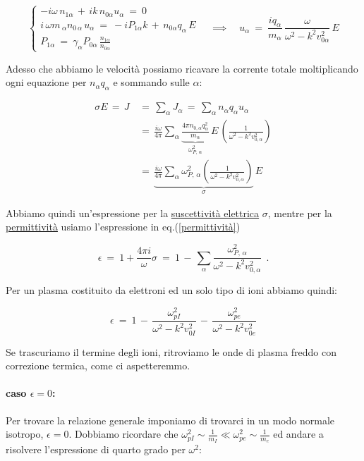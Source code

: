 \[\begin{cases}
	-i\omega\,n_{1\alpha}\,+\,ik\,n_{0\alpha}u_\alpha\ =\ 0
	\\
	i\,\omega m\,_\alpha n_{0\,\alpha}\,u_\alpha\ =\ -iP_{1\alpha}k\,+\, n_{0\alpha}q_{\alpha}\, E
	\\
	P_{1\alpha}\ =\ \gamma_\alpha P_{0\alpha}\, \frac{n_{1\alpha} }{n_{0\alpha}}\,    
\end{cases} \quad \implies \quad u_\alpha\ =\ \frac{iq_\alpha}{m_\alpha}\,\frac{\omega}{\omega^2-k^2v_{0\alpha}^2}\, E\] 

Adesso che abbiamo le velocità possiamo ricavare la corrente totale moltiplicando ogni equazione per $n_\alpha q_\alpha$ e sommando sulle $\alpha$:

\[\begin{aligned}\sigma E\,=\,J\, &=\,\sum_\alpha J_\alpha\,=\,\sum_\alpha n_\alpha q_\alpha u_\alpha\\ 
	&=\, \frac{i\omega}{4\pi} \sum_\alpha \underset{\omega^2_{P,\,\alpha}}{\underbrace{\frac{4\pi n_{0,\alpha}q^2_\alpha}{m_\alpha}}}\, E\, \left(\frac{1}{\omega^2 - k^2 v^2_{0,\alpha}}\right) \\
	&=\, \underset{\sigma}{\underbrace{\frac{i\omega}{4\pi} \sum_\alpha \omega^2_{P,\, \alpha} \left( \frac{ 1 }{ \omega^2-k^2v^2_{0,\alpha} } \right)}}\, E
\end{aligned}\]


Abbiamo quindi un'espressione per la \underline{suscettività elettrica} $\sigma$, mentre per la \underline{permittività} usiamo l'espressione in eq.(\ref{permittività})

\begin{equation}
	\label{permittività}
	\epsilon\ =\ 1+\frac{4\pi i}{\omega}\sigma\ =\ 1\,-\,\sum_\alpha \frac{ \omega^2_{P,\, \alpha} }{ \omega^2-k^2v^2_{0,\alpha} } \ \ . 
\end{equation}

Per un plasma costituito da elettroni ed un solo tipo di ioni abbiamo quindi:

\[\epsilon\ =\ 1\, - \, \frac{\omega_{pI}^2}{\omega^2-k^2v_{0I}^2}\, -\, \frac{\omega_{pe}^2}{\omega^2-k^2v_{0e}^2}\] 

Se trascuriamo il termine degli ioni, ritroviamo le onde di plasma freddo con correzione termica, come ci aspetteremmo. 


\paragraph{caso $\epsilon=0$: }
Per trovare la relazione generale imponiamo di trovarci in un modo normale isotropo, $\epsilon=0$. 
Dobbiamo ricordare che $\omega_{pI}^2\sim\frac{1}{m_I}\ll\omega_{pe}^2\sim\frac{1}{m_e}$ ed andare a risolvere l'espressione di quarto grado per $\omega^2$:

